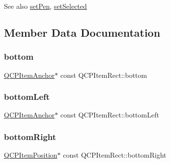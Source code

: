 \begin{DoxySeeAlso}{See also}
\hyperlink{class_q_c_p_item_rect_a483c0da5a17e1646cd17ddea2c124e7d}{set\+Pen}, \hyperlink{class_q_c_p_abstract_item_a203de94ad586cc44d16c9565f49d3378}{set\+Selected} 
\end{DoxySeeAlso}


\subsection{Member Data Documentation}
\mbox{\label{class_q_c_p_item_rect_a99313bf2b338d9f81e19bd38082038aa}} 
\subsubsection{\texorpdfstring{bottom}{bottom}}
{\footnotesize\ttfamily \hyperlink{class_q_c_p_item_anchor}{Q\+C\+P\+Item\+Anchor}$\ast$ const Q\+C\+P\+Item\+Rect\+::bottom}

\mbox{\label{class_q_c_p_item_rect_abd8ee63fdf81f0c74bf7ccadee8603da}} 
\subsubsection{\texorpdfstring{bottom\+Left}{bottomLeft}}
{\footnotesize\ttfamily \hyperlink{class_q_c_p_item_anchor}{Q\+C\+P\+Item\+Anchor}$\ast$ const Q\+C\+P\+Item\+Rect\+::bottom\+Left}

\mbox{\label{class_q_c_p_item_rect_a409f3bfe615a7e322bb3d4d193d85b26}} 
\subsubsection{\texorpdfstring{bottom\+Right}{bottomRight}}
{\footnotesize\ttfamily \hyperlink{class_q_c_p_item_position}{Q\+C\+P\+Item\+Position}$\ast$ const Q\+C\+P\+Item\+Rect\+::bottom\+Right}

\mbox{\label{class_q_c_p_item_rect_aad0ca1af0c8debfc20d7b47fc942764d}} 
